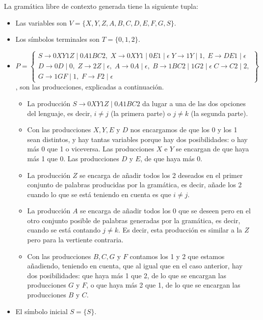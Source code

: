 \documentclass[11pt,a4paper]{article}
\begin{document}
La gramática libre de contexto generada tiene la siguiente tupla:
	\begin{itemize}
		\item Las variables son $V=\{X,Y,Z,A,B,C,D,E,F,G,S\}$.
		\item Los símbolos terminales son $T=\{0,1,2\}$.
		\item $P=\left\{\begin{array}{c}
			S\rightarrow 0XY1Z \mid 0A1BC2, \; 
			X\rightarrow 0XY1 \mid 0E1 \mid \epsilon \; 
			Y\rightarrow 1Y \mid 1, \; 
			E\rightarrow DE1 \mid \epsilon \\
			D\rightarrow 0D \mid 0, \;
			Z\rightarrow 2Z \mid \epsilon, \;
			A\rightarrow 0A \mid \epsilon, \;
			B\rightarrow 1BC2 \mid 1G2 \mid \epsilon \;
			C\rightarrow C2 \mid 2, \\
			G\rightarrow 1GF \mid 1, \;
			F\rightarrow F2 \mid \epsilon
		\end{array}\right\}$, son las producciones, explicadas a continuación.
		\begin{itemize}
			\item La producción $S\rightarrow 0XY1Z \mid 0A1BC2$ da lugar a una de las dos opciones del lenguaje, es decir, $i\not = j$ (la primera parte) o $j\not = k$ (la segunda parte).
			\item Con las producciones $X, Y, E$ y $D$ nos encargamos de que los 0 y los 1 sean distintos, y hay tantas variables porque hay dos posibilidades: o hay más 0 que 1 o viceversa. Las producciones $X$ e $Y$ se encargan de que haya más 1 que 0. Las producciones $D$ y $E$, de que haya más 0.
			\item La producción $Z$ se encarga de añadir todos los 2 deseados en el primer conjunto de palabras producidas por la gramática, es decir, añade los 2 cuando lo que se está teniendo en cuenta es que $i \not = j$.
			\item La producción $A$ se encarga de añadir todos los 0 que se deseen pero en el otro conjunto posible de palabras generadas por la gramática, es decir, cuando se está contando $j\not = k$. Es decir, esta producción es similar a la $Z$ pero para la vertiente contraria.
			\item Con las producciones $B, C, G$ y $F$ contamos los 1 y 2 que estamos añadiendo, teniendo en cuenta, que al igual que en el caso anterior, hay dos posibilidades: que haya más 1 que 2, de lo que se encargan las producciones $G$ y $F$, o que haya más 2 que 1, de lo que se encargan las producciones $B$ y $C$.
		\end{itemize}
		\item El símbolo inicial $S=\{S\}$.
	\end{itemize}
\end{document}

